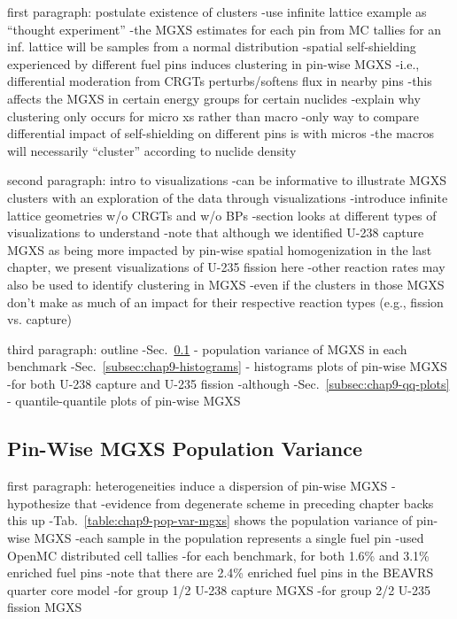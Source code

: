 first paragraph: postulate existence of clusters
-use infinite lattice example as ``thought experiment''
  -the \ac{MGXS} estimates for each pin from \ac{MC} tallies for an inf. lattice will be samples from a normal distribution
-spatial self-shielding experienced by different fuel pins induces clustering in pin-wise MGXS
  -i.e., differential moderation from \acp{CRGT} perturbs/softens flux in nearby pins
  -this affects the \ac{MGXS} in certain energy groups for certain nuclides
-explain why clustering only occurs for micro xs rather than macro
  -only way to compare differential impact of self-shielding on different pins is with micros
  -the macros will necessarily ``cluster'' according to nuclide density
  
second paragraph: intro to visualizations
-can be informative to illustrate \ac{MGXS} clusters with an exploration of the data through visualizations
-introduce infinite lattice geometries w/o \acp{CRGT} and w/o \acp{BP}
-section looks at different types of visualizations to understand
-note that although we identified U-238 capture \ac{MGXS} as being more impacted by pin-wise spatial homogenization in the last chapter, we present visualizations of U-235 fission here
  -other reaction rates may also be used to identify clustering in \ac{MGXS}
  -even if the clusters in those \ac{MGXS} don't make as much of an impact for their respective reaction types (e.g., fission vs. capture)

third paragraph: outline
-Sec.~\ref{subsec:chap9-pop-var} - population variance of \ac{MGXS} in each benchmark
-Sec.~\ref{subsec:chap9-histograms} - histograms plots of pin-wise \ac{MGXS}
  -for both U-238 capture and U-235 fission
  -although 
-Sec.~\ref{subsec:chap9-qq-plots} - quantile-quantile plots of pin-wise \ac{MGXS}

\subsection{Pin-Wise MGXS Population Variance}
\label{subsec:chap9-pop-var}

first paragraph: heterogeneities induce a dispersion of pin-wise \ac{MGXS}
-hypothesize that 
  -evidence from degenerate scheme in preceding chapter backs this up
-Tab.~\ref{table:chap9-pop-var-mgxs} shows the population variance of pin-wise \ac{MGXS}
  -each sample in the population represents a single fuel pin
    -used OpenMC distributed cell tallies
  -for each benchmark, for both 1.6\% and 3.1\% enriched fuel pins
  	-note that there are 2.4\% enriched fuel pins in the \ac{BEAVRS} quarter core model
  -for group 1/2 U-238 capture \ac{MGXS}
  -for group 2/2 U-235 fission \ac{MGXS}

